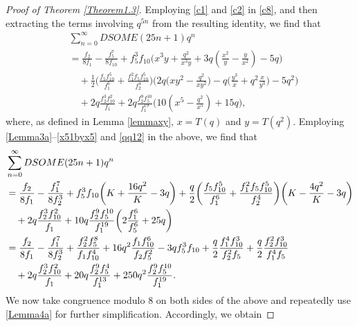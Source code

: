 \documentclass[12pt]{amsart}
\theoremstyle{definition}
\numberwithin{equation}{section}
\begin{document}
  \begin{proof}[Proof of Theorem \ref{Theorem1.3}]
  Employing \eqref{c1} and \eqref{c2} in \eqref{c8}, and then extracting the terms involving $q^{5n}$ from the resulting identity, we find that
\begin{align*}
    &\sum_{n=0}^{\infty}DSOME(25n+1)q^n\\
    &=\frac{f_2}{8f_1}-\frac{f_5^7}{8f_{10}}+f_5^3f_{10}\bigg(x^{3}y+\frac{q^2}{x^{3}y}+3q\left(\frac{x^2}{y}-\frac{y}{x^2}\right)-5q\bigg)\\
    &\quad+\frac{1}{2}\bigg(\frac{f_5f_{10}^5}{f_1^6}
    +\frac{f_1^2f_5f_{10}^5}{f_2^4}\bigg)\bigg(2q\big(xy^2-\frac{q^2}{xy^2}\big)
    -q\big(\frac{y^3}{x}+q^2\frac{x}{y^3}\big)-5q^2\bigg)\\
   &\quad+2q\frac{f_2^3f_{10}^2}{f_1}+2q\frac{f_2^9f_5^{10}}{f_1^{19}}\bigg(10\left(x^5-\frac{q^2}{x^5}\right)+15q\bigg),\end{align*}
   where, as defined in Lemma \ref{lemmaxy},  $x=T(q)$ and $y=T(q^2)$. Employing \eqref{Lemma3a}--\eqref{x51byx5} and \eqref{qq12} in the above, we find that
\begin{align*}
&\sum_{n=0}^{\infty}DSOME(25n+1)q^n\notag\\
    &=\frac{f_2}{8f_1}-\frac{f_1^7}{8f_2^3}+f_5^3f_{10}\bigg(K+\frac{16q^2}{K}-3q\bigg)+
    \frac{q}{2}\bigg(\frac{f_5f_{10}^5}{f_1^6}
    +\frac{f_1^2f_5f_{10}^5}{f_2^4}\bigg)\bigg(K-\frac{4q^2}{K}-3q\bigg)\\
    &\quad+2q\frac{f_2^3f_{10}^2}{f_1}+10q\frac{f_2^9f_5^{10}}{f_1^{19}}\bigg(2\frac{f_1^6}{f_5^6}+25q\bigg)\\
     &=\frac{f_2}{8f_1}-\frac{f_1^7}{8f_2^3}+\frac{f_2^2f_5^8}{f_1f_{10}^4}+16q^2\frac{f_1f_{10}^6}{f_2f_5^2}-3qf_5^3f_{10}
    +\frac{q}{2}\frac{f_1^4f_{10}^3}{f_2^2f_5}+\frac{q}{2}\frac{f_2^2f_{10}^3}{f_1^4f_5}\\
    &\quad+2q\frac{f_2^3f_{10}^2}{f_1}+20q\frac{f_2^9f_5^4}{f_1^{13}}+250q^2\frac{f_2^9f_5^{10}}{f_1^{19}}.
\end{align*}
We now take congruence modulo 8 on both sides of the above and repeatedly use \eqref{Lemma4a} for further simplification. Accordingly, we obtain


\end{proof}
\end{document}
